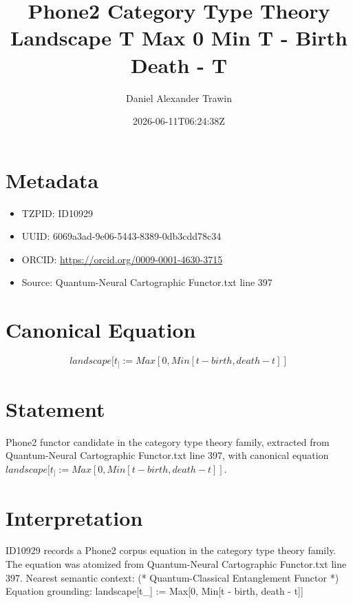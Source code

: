 \documentclass[11pt]{article}
\title{Phone2 Category Type Theory Landscape T Max 0 Min T - Birth Death - T}
\author{Daniel Alexander Trawin}
\date{2026-06-11T06:24:38Z}
\begin{document}
\maketitle
\section*{Metadata}
\begin{itemize}
\item TZPID: ID10929
\item UUID: 6069a3ad-9e06-5443-8389-0db3cdd78c34
\item ORCID: \url{https://orcid.org/0009-0001-4630-3715}
\item Source: Quantum-Neural Cartographic Functor.txt line 397
\end{itemize}
\section*{Canonical Equation}
\[
landscape[t_] := Max[0, Min[t - birth, death - t]]
\]
\section*{Statement}
Phone2 functor candidate in the category type theory family, extracted from Quantum-Neural Cartographic Functor.txt line 397, with canonical equation $landscape[t_] := Max[0, Min[t - birth, death - t]]$.
\section*{Interpretation}
ID10929 records a Phone2 corpus equation in the category type theory family. The equation was atomized from Quantum-Neural Cartographic Functor.txt line 397. Nearest semantic context: (* Quantum-Classical Entanglement Functor *) Equation grounding: landscape[t_] := Max[0, Min[t - birth, death - t]]
\end{document}
